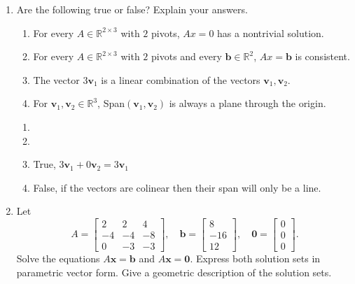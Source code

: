 \documentclass[12pt,a4paper]{exam}
\newcommand{\bb}{\mathbf{b}}
\newcommand{\bv}{\mathbf{v}}
\newcommand{\bx}{\mathbf{x}}
\newcommand{\R}{\mathbb{R}}
\begin{document}
\begin{enumerate}
\item
 Are the following true or false? Explain your answers.
\begin{enumerate}
\item
 For every $A\in\R^{2\times 3}$ with $2$ pivots, $Ax=0$ has a nontrivial solution.
  
\item
 For every $A\in\R^{2\times 3}$ with $2$ pivots and every $\bb\in\R^2$, $Ax=\bb$ is consistent.

\item
 The vector $3\bv_1$ is a linear combination of the vectors $\bv_1,\bv_2$.

\item
 For $\bv_1,\bv_2\in\mathbb{R}^3$, Span$(\bv_1,\bv_2)$ is always a plane 
 through the origin.
\end{enumerate}


\begin{solution}
  \begin{enumerate}
    \item
    \item
    \item True, $3\bv_1+0\bv_2=3\bv_1$
    \item False, if the vectors are colinear then their span will only be a line.
  \end{enumerate}
\end{solution}


\item \cite[cf. Section 1.5, Ex 17]{La-LA}
Let 
\[ 
A=\left[\begin{matrix} 2 & 2 & 4 \\ -4 & -4 & -8 \\ 0 & -3 & -3 
\end{matrix}\right], \quad 
\bb=\left[\begin{matrix} 8 \\ -16 \\ 12 \end{matrix}\right], \quad
\mathbf{0}=\left[\begin{matrix} 0 \\ 0 \\ 0 \end{matrix}\right]. 
\]
Solve the equations $A\bx=\bb$ and  $A\bx=\mathbf{0}$. Express both solution sets in parametric vector form.
Give a geometric description of the solution sets.


\end{enumerate}
\end{document}
